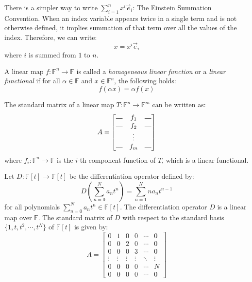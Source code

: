 \documentclass[
	11pt, %
	fleqn, %
	a4paper, %
]{LegrandOrangeBook}
\newcommand{\F}{\mathbb{F}} %
\newcommand{\hdash}{\rotatebox{90}{$|$}}
\begin{document}
There is a simpler way to write $\sum_{i=1}^{n} x^i \vec{e}_i$: The Einstein Summation Convention. When an index variable appears twice in a single term and is not otherwise defined, it implies summation of that term over all the values of the index. Therefore, we can write:
\[
    x = x^i \vec{e}_i
\]
where $i$ is summed from $1$ to $n$. 

\begin{definition}
    A linear map $f: \F^n \to \F$ is called a \emph{homogeneous linear function} or a \emph{linear functional} if for all $\alpha \in \F$ and $x \in \F^n$, the following holds:
    \[
        f(\alpha x) = \alpha f(x)
    \]
\end{definition}

\begin{corollary}
    The standard matrix of a linear map $T: \F^n \to \F^m$ can be written as:
    \[
        A = \begin{bmatrix}
            \hdash & f_1 & \hdash \\
            \hdash & f_2 & \hdash \\
            & \vdots & \\
            \hdash & f_m & \hdash
        \end{bmatrix}
    \]
    where $f_i: \F^n \to \F$ is the $i$-th component function of $T$, which is a linear functional.
\end{corollary}

\begin{example}
    Let $D: \F[t] \to \F[t]$ be the differentiation operator defined by:
    \[
        D\left( \sum_{n=0}^{N} a_n t^n \right) = \sum_{n=1}^{N} n a_n t^{n-1}
    \]
    for all polynomials $\sum_{n=0}^{N} a_n t^n \in \F[t]$. The differentiation operator $D$ is a linear map over $\F$. The standard matrix of $D$ with respect to the standard basis $\{1, t, t^2, \cdots, t^N\}$ of $\F[t]$ is given by:
    \[
        A = \begin{bmatrix}
            0 & 1 & 0 & 0 & \cdots & 0 \\
            0 & 0 & 2 & 0 & \cdots & 0 \\
            0 & 0 & 0 & 3 & \cdots & 0 \\
            \vdots & \vdots & \vdots & \vdots & \ddots & \vdots \\
            0 & 0 & 0 & 0 & \cdots & N \\
            0 & 0 & 0 & 0 & \cdots & 0
        \end{bmatrix}
    \]
\end{example}
\end{document}
